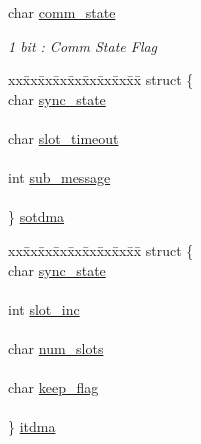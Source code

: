 \begin{DoxyCompactItemize}
char \mbox{\hyperlink{structaismsg__9_ab892d4a2d1113b55991b93d91a638630}{comm\+\_\+state}}
\begin{DoxyCompactList}\small\item\em 1 bit \+: Comm State Flag \end{DoxyCompactList}\item 
\begin{tabbing}
xx\=xx\=xx\=xx\=xx\=xx\=xx\=xx\=xx\=\kill
struct \{\\
\>char \mbox{\hyperlink{structaismsg__9_ab8d3e28d3fd5dd63dfbabb062542bc2e}{sync\_state}}\\
\>\\
\>char \mbox{\hyperlink{structaismsg__9_acfb357582c843a5ebab66dc0c8fca310}{slot\_timeout}}\\
\>\\
\>int \mbox{\hyperlink{structaismsg__9_a9d2f899ec16707fbbf0d4ad5ab6c8b48}{sub\_message}}\\
\>\\
\} \mbox{\hyperlink{structaismsg__9_ab1aaa1ece43de71eac51307706335d0b}{sotdma}}\\

\end{tabbing}\item 
\begin{tabbing}
xx\=xx\=xx\=xx\=xx\=xx\=xx\=xx\=xx\=\kill
struct \{\\
\>char \mbox{\hyperlink{structaismsg__9_ab8d3e28d3fd5dd63dfbabb062542bc2e}{sync\_state}}\\
\>\\
\>int \mbox{\hyperlink{structaismsg__9_a7b81b6ff7daa453ccfbc33034f913704}{slot\_inc}}\\
\>\\
\>char \mbox{\hyperlink{structaismsg__9_ad073c40d4bafdf413ac4b37b37e2b314}{num\_slots}}\\
\>\\
\>char \mbox{\hyperlink{structaismsg__9_af5c092aadb88d05b1aad19abd599e66c}{keep\_flag}}\\
\>\\
\} \mbox{\hyperlink{structaismsg__9_a6e9c9c7038c7564b276cb945e0ed39d2}{itdma}}\\

\end{tabbing}\end{DoxyCompactItemize}


